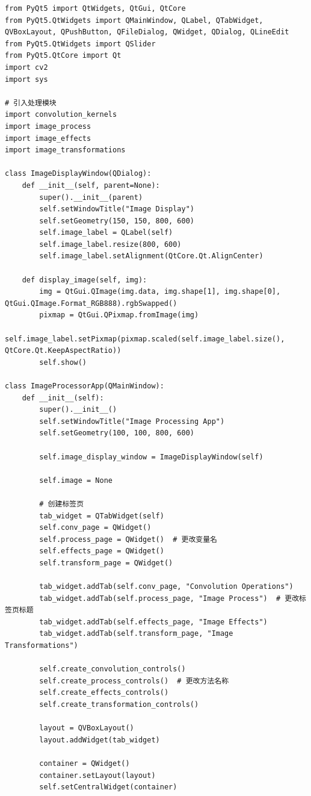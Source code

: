 \documentclass[a4paper,12pt]{article}
\begin{document}
\begin{lstlisting}[style=python]
from PyQt5 import QtWidgets, QtGui, QtCore
from PyQt5.QtWidgets import QMainWindow, QLabel, QTabWidget, QVBoxLayout, QPushButton, QFileDialog, QWidget, QDialog, QLineEdit
from PyQt5.QtWidgets import QSlider
from PyQt5.QtCore import Qt
import cv2
import sys

# 引入处理模块
import convolution_kernels
import image_process
import image_effects
import image_transformations

class ImageDisplayWindow(QDialog):
    def __init__(self, parent=None):
        super().__init__(parent)
        self.setWindowTitle("Image Display")
        self.setGeometry(150, 150, 800, 600)
        self.image_label = QLabel(self)
        self.image_label.resize(800, 600)
        self.image_label.setAlignment(QtCore.Qt.AlignCenter)

    def display_image(self, img):
        img = QtGui.QImage(img.data, img.shape[1], img.shape[0], QtGui.QImage.Format_RGB888).rgbSwapped()
        pixmap = QtGui.QPixmap.fromImage(img)
        self.image_label.setPixmap(pixmap.scaled(self.image_label.size(), QtCore.Qt.KeepAspectRatio))
        self.show()

class ImageProcessorApp(QMainWindow):
    def __init__(self):
        super().__init__()
        self.setWindowTitle("Image Processing App")
        self.setGeometry(100, 100, 800, 600)

        self.image_display_window = ImageDisplayWindow(self)

        self.image = None

        # 创建标签页
        tab_widget = QTabWidget(self)
        self.conv_page = QWidget()
        self.process_page = QWidget()  # 更改变量名
        self.effects_page = QWidget()
        self.transform_page = QWidget()

        tab_widget.addTab(self.conv_page, "Convolution Operations")
        tab_widget.addTab(self.process_page, "Image Process")  # 更改标签页标题
        tab_widget.addTab(self.effects_page, "Image Effects")
        tab_widget.addTab(self.transform_page, "Image Transformations")

        self.create_convolution_controls()
        self.create_process_controls()  # 更改方法名称
        self.create_effects_controls()
        self.create_transformation_controls()

        layout = QVBoxLayout()
        layout.addWidget(tab_widget)

        container = QWidget()
        container.setLayout(layout)
        self.setCentralWidget(container)


\end{lstlisting}
\end{document}
